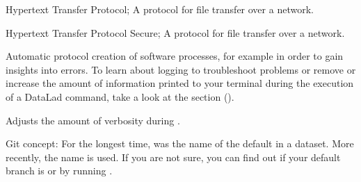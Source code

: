 \begin{description}
\ignorespaces 
\sphinxAtStartPar
Hypertext Transfer Protocol; A protocol for file transfer over a network.

\ignorespaces 
\sphinxAtStartPar
Hypertext Transfer Protocol Secure; A protocol for file transfer over a network.

\sphinxAtStartPar
Automatic protocol creation of software processes, for example in order to gain insights into errors. To learn about logging to troubleshoot problems or remove or increase the amount of information printed to your terminal during the execution of a DataLad command, take a look at the section {\hyperref[\detokenize{basics/101-135-help:logging}]{}} ().

\ignorespaces 
\sphinxAtStartPar
Adjusts the amount of verbosity during {\hyperref[\detokenize{glossary:term-logging}]{}}.

\ignorespaces 
\sphinxAtStartPar
Git concept: For the longest time,  was the name of the default {\hyperref[\detokenize{glossary:term-branch}]{}} in a dataset. More recently, the name  is used. If you are not sure, you can find out if your default branch is  or  by running .


\end{description}
